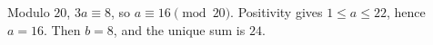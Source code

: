 Modulo $20$, $3a\equiv8$, so $a\equiv16\pmod{20}$. Positivity gives $1\le a\le22$, hence $a=16$. Then $b=8$, and the unique sum is $\boxed{24}$.
